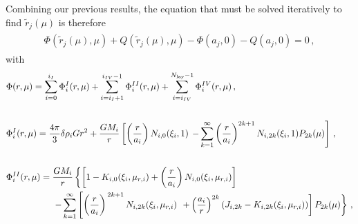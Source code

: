 \documentclass[11pt, oneside]{article}   	%
\begin{document}
Combining our previous results, the equation that must be solved iteratively to find $\tilde{r}_j (\mu)$ is therefore
%
\begin{align}
\begin{aligned}
\label{HUG:eqn:all_start}
 \Phi(\tilde{r}_j(\mu), \mu) + Q(\tilde{r}_j(\mu), \mu)-\Phi(a_j,0) - Q(a_j,0) = 0 \,,
\end{aligned}
\end{align}
%
with
%
\begin{align}
& \begin{aligned}
\Phi (r, \mu) & = \sum_{i=0}^{i_{I}} \Phi^{I}_i (r, \mu) + \sum_{i=i_{I}+1}^{i_{IV}-1} \Phi^{II}_i (r, \mu) +  \sum_{i=i_{IV}}^{N_{\rm lay}-1} \Phi^{IV}_i (r, \mu) \,,
\end{aligned} \\[4ex]
%
& \begin{aligned}
\Phi_i^I(r,\mu){} & =  \frac{4\pi}{3} \delta\rho_i G r^2 + \frac{G M_i}{r} \left [ \left ( \frac{r}{a_i} \right ) N_{i,0}(\xi_i, 1) \right . \left . - \sum_{k=1}^{\infty}  \left ( \frac{r}{a_i} \right )^{2k+1} N_{i,2k}(\xi_i,1) P_{2k}(\mu) \right ] \,,
\end{aligned} \\[4ex]
%
& \begin{aligned}
\Phi^{II}_i(r,\mu) ={} & \frac{G M_i}{r} \left \{ \left [ 1 - K_{i,0}(\xi_i, \mu_{r,i}) + \left ( \frac{r}{a_i} \right ) N_{i,0} (\xi_i, \mu_{r,i}) \right ] \right .\\
& \left . - \sum_{k=1}^{\infty} \left [   \left (\frac{r}{a_i} \right )^{ \, 2 k + 1} N_{i,2k}(\xi_i, \mu_{r, i}) \right. \right. \left.  \left. + \left (\frac{a_i}{r} \right )^{2 k} (J_{i,2k}-K_{i,2k}(\xi_i, \mu_{r,i}) )\right ] P_{2k}(\mu) \right \} \,,
\end{aligned}
\end{align}
%
\end{document}
